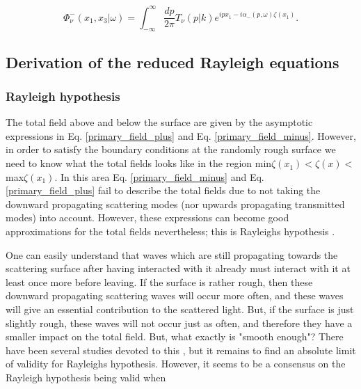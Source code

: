 \documentclass[../main.tex]{subfiles}
\begin{document}

\begin{equation}
    \Phi_{\nu}^{-}\left(x_1, x_3|\omega \right) = \int_{-\infty}^{\infty}\frac{dp}{2 \pi} T_{\nu}\left(p|k \right)e^{ipx_1-i\alpha_-\left(p,\omega \right)\zeta\left(x_1 \right)}.
\label{primary_field_minus}
\end{equation}



\subsection{Derivation of the reduced Rayleigh equations}
\subsubsection{Rayleigh hypothesis}

The total field above and below the surface are given by the asymptotic expressions in Eq. \ref{primary_field_plus} and Eq. \ref{primary_field_minus}. However, in order to satisfy the boundary conditions at the randomly rough surface we need to know what the total fields looks like in the region min$\zeta(x_1) < \zeta(x) < $ max$\zeta(x_1)$. In this area Eq. \ref{primary_field_minus} and Eq. \ref{primary_field_plus} fail to describe the total fields due to not taking the downward propagating scattering  modes (nor upwards propagating transmitted modes) into account. However, these expressions can become good approximations for the total fields nevertheless; this is Rayleighs hypothesis \cite{Rayleigh1907, Voronovich}.

One can easily understand that waves which are still propagating towards the scattering surface after having interacted with it already must interact with it at least once more before leaving. If the surface is rather rough, then these downward propagating scattering waves will occur more often, and these waves will give an essential contribution to the scattered light. 
But, if the surface is just slightly rough, these waves will not occur just as often, and therefore they have a smaller impact on the total field.
But, what exactly is "smooth enough"? There have been several studies devoted to this \cite{Watanabe, Voronovich, Tishchenko:09}, but it remains to find an absolute limit of validity for Rayleighs hypothesis. However, it seems to be a consensus on  the Rayleigh hypothesis being valid when 
\end{document}
